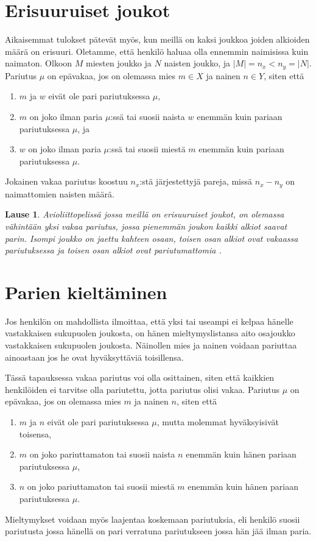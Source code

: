 \documentclass[finnish]{tktltiki2}
\newtheorem{lau}{Lause}
\theoremstyle{definition}
\theoremstyle{remark}
\begin{document}
\section{Erisuuruiset joukot}
Aikaisemmat tulokset pätevät myös, kun meillä on kaksi joukkoa joiden alkioiden määrä on erisuuri. Oletamme, että henkilö haluaa olla ennemmin naimisissa kuin naimaton.
Olkoon $M$ miesten joukko ja $N$ naisten joukko, ja $|M| = n_x < n_y = |N|$. Pariutus $\mu$ on epävakaa, jos on olemassa mies $m \in X$ ja nainen $n \in Y$, siten että

\begin{enumerate}
	\item $m$ ja $w$ eivät ole pari pariutuksessa $\mu$,
	\item $m$ on joko ilman paria $\mu$:ssä tai suosii naista $w$ enemmän kuin pariaan pariutuksessa $\mu$, ja
	\item $w$ on joko ilman paria $\mu$:ssä tai suosii miestä $m$ enemmän kuin pariaan pariutuksessa $\mu$.
\end{enumerate}
Jokainen vakaa pariutus koostuu $n_x$:stä järjestettyjä pareja, missä $n_x - n_y$ on naimattomien naisten määrä.

\begin{lau}
Avioliittopelissä jossa meillä on erisuuruiset joukot, on olemassa vähintään yksi vakaa pariutus, jossa pienemmän joukon kaikki alkiot saavat parin. Isompi joukko on jaettu kahteen osaan, toisen osan alkiot ovat vakaassa pariutuksessa ja toisen osan alkiot ovat pariutumattomia \cite[p. 26]{gusfield1989stable}.
\end{lau}

\section{Parien kieltäminen}
Jos henkilön on mahdollista ilmoittaa, että yksi tai useampi ei kelpaa hänelle vastakkaisen sukupuolen joukosta, on hänen mieltymyslistansa aito osajoukko vastakkaisen sukupuolen joukosta. Näinollen mies ja nainen voidaan pariuttaa ainoastaan jos he ovat hyväksyttäviä toisillensa.

Tässä tapauksessa vakaa pariutus voi olla osittainen, siten että kaikkien henkilöiden ei tarvitse olla pariutettu, jotta pariutus olisi vakaa. Pariutus $\mu$ on epävakaa, jos on olemassa mies $m$ ja nainen $n$, siten että
\begin{enumerate}
	\item $m$ ja $n$ eivät ole pari pariutuksessa $\mu$, mutta molemmat hyväksyisivät toisensa,
	\item $m$ on joko pariuttamaton tai suosii naista $n$ enemmän kuin hänen pariaan pariutuksessa $\mu$,
	\item $n$ on joko pariuttamaton tai suosii miestä $m$ enemmän kuin hänen pariaan pariutuksessa $\mu$.
\end{enumerate} 
Mieltymykset voidaan myös laajentaa koskemaan pariutuksia, eli henkilö suosii pariutusta jossa hänellä on pari verratuna pariutukseen jossa hän jää ilman paria.
\end{document}

